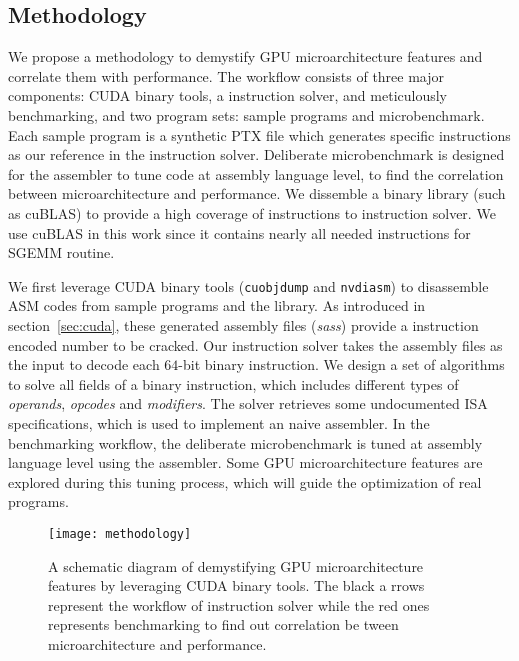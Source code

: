 \subsection{Methodology}


We propose a methodology to demystify GPU microarchitecture features and correlate them with performance. 
The workflow consists of three major components: CUDA binary tools, a instruction solver, and meticulously benchmarking, and two program sets: sample programs and microbenchmark.
Each sample program is a synthetic PTX file which generates specific instructions as our reference in the instruction solver. 
Deliberate microbenchmark is designed for the assembler to tune code at assembly language level, to find the correlation between microarchitecture and performance.
We dissemble a binary library (such as cuBLAS) to provide a high coverage of instructions to instruction solver.
We use cuBLAS in this work since it contains nearly all needed instructions for SGEMM routine. 

We first leverage CUDA binary tools ({\tt cuobjdump} and {\tt nvdiasm}) to disassemble ASM codes from sample programs and the library. 
As introduced in section~\ref{sec:cuda}, these generated assembly files ({\em sass}) provide a instruction encoded number to be cracked.
Our instruction solver takes the assembly files as the input to decode each $64$-bit binary instruction.
We design a set of algorithms to solve all fields of a binary instruction, which includes different types of {\em operands}, {\em opcodes} and {\em modifiers}. 
The solver retrieves  some undocumented ISA specifications, which is used to implement an naive assembler.
In the benchmarking workflow, the deliberate microbenchmark is tuned at assembly language level using the assembler. 
Some GPU microarchitecture features are explored during this tuning process, which will guide the optimization of real programs.


\begin{figure}[htbp]
\begin{center}
\texttt{[image: methodology]}
\caption{A schematic diagram of demystifying GPU microarchitecture features by leveraging CUDA binary tools. The black a
rrows represent the workflow of instruction solver while the red ones represents benchmarking to find out correlation be
tween microarchitecture and performance.}
\label{fig:workflow}
\end{center}
\end{figure}


